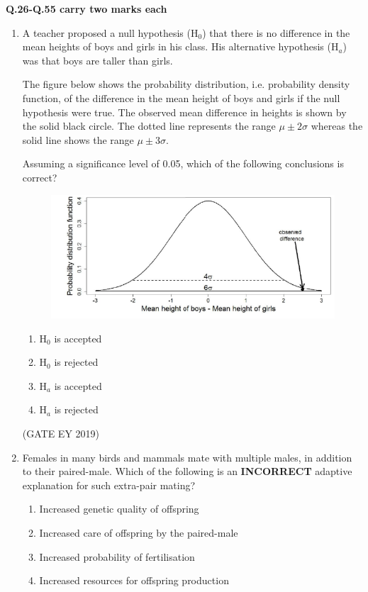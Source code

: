 \documentclass[journal,12pt,onecolumn]{IEEEtran}
\theoremstyle{remark}
\begin{document}
\textbf{Q.26-Q.55 carry two marks each}
\begin{enumerate}[resume]
\item A teacher proposed a null hypothesis (H$_0$) that there is no difference in the mean heights of boys and girls in his class. His alternative hypothesis (H$_a$) was that boys are taller than girls.  

The figure below shows the probability distribution, i.e. probability density function, of the difference in the mean height of boys and girls if the null hypothesis were true. The observed mean difference in heights is shown by the solid black circle. The dotted line represents the range $\mu \pm 2\sigma$ whereas the solid line shows the range $\mu \pm 3\sigma$.  


Assuming a significance level of 0.05, which of the following conclusions is correct? 
\begin{figure}[h]
    \centering
    \includegraphics[]{figs/26.png}
\end{figure}

\begin{multicols}{2}
\begin{enumerate}
\item H$_0$ is accepted
\item H$_0$ is rejected
\item H$_a$ is accepted
\item H$_a$ is rejected
\end{enumerate}
\end{multicols}

\hfill{(GATE EY 2019)}
\item Females in many birds and mammals mate with multiple males, in addition to their paired-male. Which of the following is an \textbf{INCORRECT} adaptive explanation for such extra-pair mating?  
\begin{multicols}{2}
\begin{enumerate}
\item   Increased genetic quality of offspring
\item   Increased care of offspring by the paired-male
\item   Increased probability of fertilisation
\item   Increased resources for offspring production
\end{enumerate}
\end{multicols}


\end{enumerate}
\end{document}
